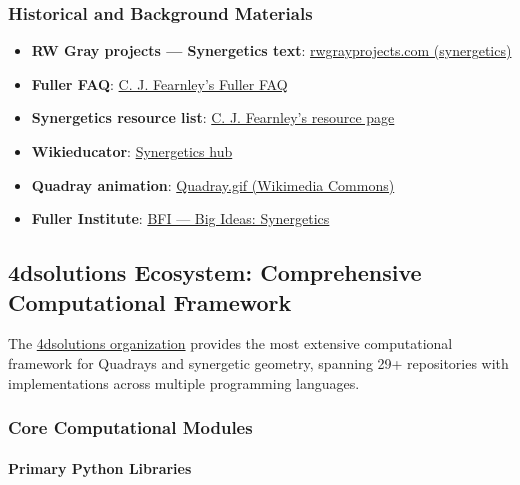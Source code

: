 \documentclass[
  10pt,
]{article}
\providecommand{\tightlist}{%
  \setlength{\itemsep}{0pt}\setlength{\parskip}{0pt}}
\begin{document}
\subsubsection{Historical and Background
Materials}\label{historical-and-background-materials}

\begin{itemize}
\tightlist
\item
  \textbf{RW Gray projects --- Synergetics text}:
  \href{http://www.rwgrayprojects.com/synergetics/s00/p0000.html}{rwgrayprojects.com
  (synergetics)}
\item
  \textbf{Fuller FAQ}:
  \href{https://www.cjfearnley.com/fuller-faq.pdf}{C. J. Fearnley's
  Fuller FAQ}
\item
  \textbf{Synergetics resource list}:
  \href{https://www.cjfearnley.com/fuller-faq-2.html}{C. J. Fearnley's
  resource page}
\item
  \textbf{Wikieducator}:
  \href{https://wikieducator.org/Synergetics}{Synergetics hub}
\item
  \textbf{Quadray animation}:
  \href{https://commons.wikimedia.org/wiki/File:Quadray.gif}{Quadray.gif
  (Wikimedia Commons)}
\item
  \textbf{Fuller Institute}:
  \href{https://www.bfi.org/about-fuller/big-ideas/synergetics/}{BFI ---
  Big Ideas: Synergetics}
\end{itemize}

\subsection{4dsolutions Ecosystem: Comprehensive Computational
Framework}\label{dsolutions-ecosystem-comprehensive-computational-framework}

The \href{https://github.com/4dsolutions}{4dsolutions organization}
provides the most extensive computational framework for Quadrays and
synergetic geometry, spanning 29+ repositories with implementations
across multiple programming languages.

\subsubsection{Core Computational
Modules}\label{core-computational-modules}

\paragraph{Primary Python Libraries}\label{primary-python-libraries}
\end{document}
